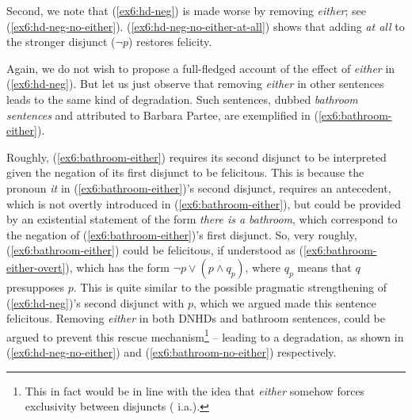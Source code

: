 Second, we note that (\ref{ex6:hd-neg}) is made worse by removing \textit{either}; see (\ref{ex6:hd-neg-no-either}). (\ref{ex6:hd-neg-no-either-at-all}) shows that adding \textit{at all} to the stronger disjunct ($\neg p$) restores felicity.

\begin{exe}
	\ex
	\begin{xlist}	
		\label{ex6:hd-neg-no-either}
		\label{ex6:hd-neg-no-either-at-all}
	\end{xlist}
\end{exe}

Again, we do not wish to propose a full-fledged account of the effect of \textit{either} in (\ref{ex6:hd-neg}). But let us just observe that removing \textit{either} in other sentences leads to the same kind of degradation. Such sentences, dubbed \textit{bathroom sentences} \citep{Evans1977} and attributed to Barbara Partee, are exemplified in (\ref{ex6:bathroom-either}). 

\begin{exe}
	\ex \label{ex6:bathroom}
	\begin{xlist}
		\label{ex6:bathroom-either}
		\label{ex6:bathroom-no-either}
		\label{ex6:bathroom-either-overt}
	\end{xlist}
\end{exe}
Roughly, (\ref{ex6:bathroom-either}) requires its second disjunct to be interpreted given the negation of its first disjunct to be felicitous. This is because the pronoun \textit{it} in (\ref{ex6:bathroom-either})'s second disjunct, requires an antecedent, which is not overtly introduced in (\ref{ex6:bathroom-either}), but could be provided by an existential statement of the form \textit{there is a bathroom}, which correspond to the negation of (\ref{ex6:bathroom-either})'s first disjunct. So, very roughly, (\ref{ex6:bathroom-either}) could be felicitous, if understood as (\ref{ex6:bathroom-either-overt}), which has the form $\neg p \vee (p \wedge q_p)$, where $q_p$ means that $q$ presupposes $p$. This is quite similar to the possible pragmatic strengthening of (\ref{ex6:hd-neg})'s second disjunct with $p$, which we argued made this sentence felicitous. Removing \textit{either} in both DNHDs and bathroom sentences, could be argued to prevent this rescue mechanism\footnote{This in fact would be in line with the idea that \textit{either} somehow forces exclusivity between disjuncts ( i.a.).} -- leading to a degradation, as shown in (\ref{ex6:hd-neg-no-either}) and (\ref{ex6:bathroom-no-either}) respectively.\\


